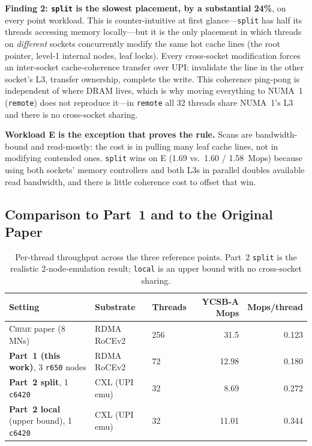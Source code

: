 \documentclass[11pt]{article}
\begin{document}
\textbf{Finding 2: \texttt{split} is the slowest placement, by a substantial 24\%}, on every point workload. This is counter-intuitive at first glance---\texttt{split} has half its threads accessing memory locally---but it is the only placement in which threads on \emph{different} sockets concurrently modify the same hot cache lines (the root pointer, level-1 internal nodes, leaf locks). Every cross-socket modification forces an inter-socket cache-coherence transfer over UPI: invalidate the line in the other socket's L3, transfer ownership, complete the write. This coherence ping-pong is independent of where DRAM lives, which is why moving everything to NUMA~1 (\texttt{remote}) does not reproduce it---in \texttt{remote} all 32 threads share NUMA~1's L3 and there is no cross-socket sharing.

\textbf{Workload E is the exception that proves the rule.} Scans are bandwidth-bound and read-mostly: the cost is in pulling many leaf cache lines, not in modifying contended ones. \texttt{split} wins on E (1.69 vs.\ 1.60 / 1.58~Mops) because using both sockets' memory controllers and both L3s in parallel doubles available read bandwidth, and there is little coherence cost to offset that win.

\subsection{Comparison to Part~1 and to the Original Paper}
\begin{table}[h]
\centering
\small
\begin{tabular}{@{}lllrr@{}}
\toprule
\textbf{Setting} & \textbf{Substrate} & \textbf{Threads} & \textbf{YCSB-A Mops} & \textbf{Mops/thread} \\ \midrule
\textsc{Chime} paper (8 MNs)            & RDMA RoCEv2 & 256 & 31.5 & 0.123 \\
\textbf{Part~1 (this work)}, 3 \texttt{r650} nodes & RDMA RoCEv2 & 72  & 12.98 & 0.180 \\
\textbf{Part~2 split}, 1 \texttt{c6420}   & CXL (UPI emu) & 32  & 8.69  & 0.272 \\
\textbf{Part~2 local} (upper bound), 1 \texttt{c6420} & CXL (UPI emu) & 32 & 11.01 & 0.344 \\ \bottomrule
\end{tabular}
\caption{Per-thread throughput across the three reference points. Part~2 \texttt{split} is the realistic 2-node-emulation result; \texttt{local} is an upper bound with no cross-socket sharing.}
\label{tab:cross_compare}
\end{table}
\end{document}

